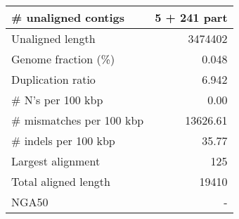 \documentclass[12pt,a4paper]{article}
\begin{document}
\begin{table}[ht]
\begin{center}
\begin{tabular}{|l*{1}{|r}|}
\# unaligned contigs & 5 + 241 part \\ \hline
Unaligned length & 3474402 \\ \hline
Genome fraction (\%) & 0.048 \\ \hline
Duplication ratio & 6.942 \\ \hline
\# N's per 100 kbp & 0.00 \\ \hline
\# mismatches per 100 kbp & 13626.61 \\ \hline
\# indels per 100 kbp & 35.77 \\ \hline
Largest alignment & 125 \\ \hline
Total aligned length & 19410 \\ \hline
NGA50 & - \\ \hline
\end{tabular}
\end{center}
\end{table}
\end{document}
